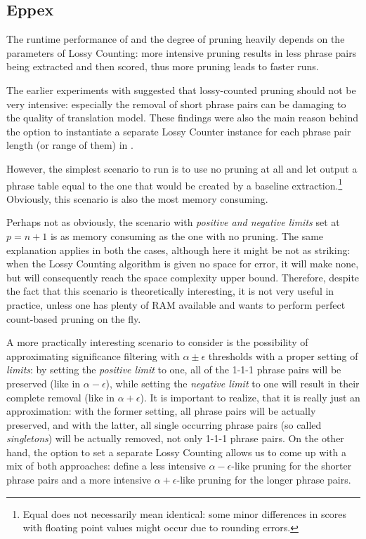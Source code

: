\subsection{Eppex}

The runtime performance of \eppex{} and the degree of pruning heavily depends
on the parameters of Lossy Counting: more intensive pruning results in less phrase pairs
being extracted and then scored, thus more pruning leads to faster \eppex{} runs.

The earlier experiments with \eppex{} \citep{przywara:eppex} suggested that lossy-counted
pruning should not be very intensive: especially the removal of short phrase pairs can be
damaging to the quality of translation model.
These findings were also the main reason behind the option to instantiate a separate
Lossy Counter instance for each phrase pair length (or range of them) in \eppex{}.

However, the simplest scenario to run is to use no pruning at all and let \eppex{} output
a phrase table equal to the one that would be created by a baseline extraction.\footnote{Equal
does not necessarily mean identical: some minor differences in scores with floating point
values might occur due to rounding errors.}
Obviously, this scenario is also the most memory consuming.

Perhaps not as obviously, the scenario with \emph{positive and negative limits} set at
$p = n + 1$ is as memory consuming as the one with no pruning.
The same explanation applies in both the cases, although here it might be not as striking:
when the Lossy Counting algorithm is given no space for error, it will make none,
but will consequently reach the space complexity upper bound.
Therefore, despite the fact that this scenario is theoretically interesting, it is not very
useful in practice, unless one has plenty of RAM available and wants to perform perfect
count-based pruning on the fly.

A more practically interesting scenario to consider is the possibility of approximating
significance filtering with $\alpha \pm \epsilon$ thresholds with a proper setting of
\emph{limits}: by setting the \emph{positive limit} to one, all of the 1-1-1 phrase pairs
will be preserved (like in $\alpha - \epsilon$), while setting the \emph{negative limit} to
one will result in their complete removal (like in $\alpha + \epsilon$).
It is important to realize, that it is really just an approximation:
with the former setting, all phrase pairs will be actually preserved,
and with the latter, all single occurring phrase pairs (so called \emph{singletons})
will be actually removed, not only 1-1-1 phrase pairs.
On the other hand, the option to set a separate Lossy Counting allows us to come up with
a mix of both approaches: define a less intensive $\alpha - \epsilon$-like pruning for
the shorter phrase pairs and a more intensive $\alpha + \epsilon$-like pruning for the
longer phrase pairs.

